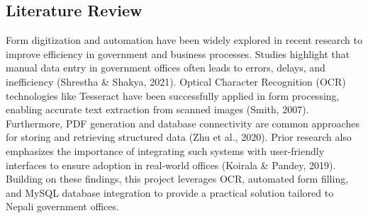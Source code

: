 \documentclass[12pt,a4paper]{report}
\begin{document}
\subsection{Literature Review}
Form digitization and automation have been widely explored in recent research to improve efficiency in government and business processes. Studies highlight that manual data entry in government offices often leads to errors, delays, and inefficiency (Shrestha & Shakya, 2021). Optical Character Recognition (OCR) technologies like Tesseract have been successfully applied in form processing, enabling accurate text extraction from scanned images (Smith, 2007). Furthermore, PDF generation and database connectivity are common approaches for storing and retrieving structured data (Zhu et al., 2020). Prior research also emphasizes the importance of integrating such systems with user-friendly interfaces to ensure adoption in real-world offices (Koirala & Pandey, 2019). Building on these findings, this project leverages OCR, automated form filling, and MySQL database integration to provide a practical solution tailored to Nepali government offices.
\end{document}
